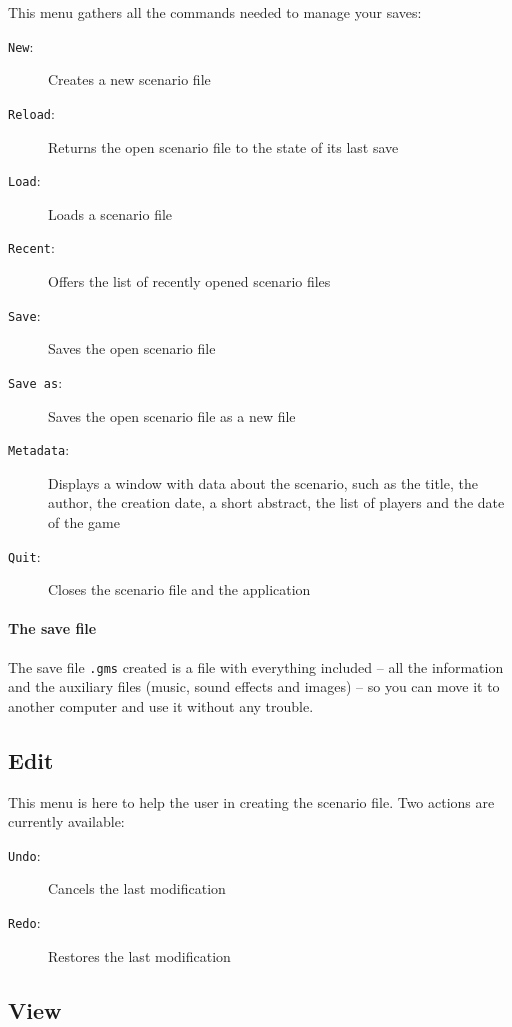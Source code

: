 \documentclass[a4paper,12pt]{article}
\newcommand*{\interfaceitem}[1]{\texttt{#1}}
\begin{document}
This menu gathers all the commands needed to manage your saves:
\begin{description}
    \item[\interfaceitem{New}:]{Creates a new scenario file}
    \item[\interfaceitem{Reload}:]{Returns the open scenario file to the state of its last save}
    \item[\interfaceitem{Load}:]{Loads a scenario file}
    \item[\interfaceitem{Recent}:]{Offers the list of recently opened scenario files}
    \item[\interfaceitem{Save}:]{Saves the open scenario file}
    \item[\interfaceitem{Save as}:]{Saves the open scenario file as a new file}
    \item[\interfaceitem{Metadata}:]{Displays a window with data about the scenario, such as the title, the author, the creation date, a short abstract, the list of players and the date of the game}
    \item[\interfaceitem{Quit}:]{Closes the scenario file and the application}
\end{description}
\paragraph{The save file}

The save file \texttt{.gms} created is a file with everything included -- all the information and the auxiliary files (music, sound effects and images) -- so you can move it to another computer and use it without any trouble.

\subsection{Edit}
\label{sec:edit}

This menu is here to help the user in creating the scenario file. Two actions are currently available:
\begin{description}
    \item[\interfaceitem{Undo}:]{Cancels the last modification}
    \item[\interfaceitem{Redo}:]{Restores the last modification}
\end{description}

\subsection{View}
\label{sec:view}
\end{document}
